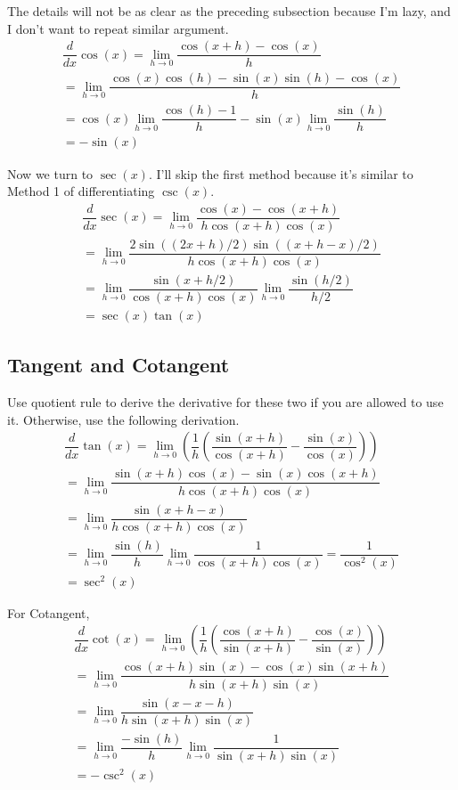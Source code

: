 \documentclass{article}
\theoremstyle{definition}
\theoremstyle{definition}
\theoremstyle{definition}
\theoremstyle{definition}
\theoremstyle{definition}
\theoremstyle{definition}
\theoremstyle{definition}
\theoremstyle{definition}
\theoremstyle{definition}
\begin{document}
The details will not be as clear as the preceding subsection because I'm lazy, and I don't want to repeat similar argument.
\begin{align*}
    \dfrac{d}{dx}\cos(x)=\lim_{h\to0}\dfrac{\cos(x+h)-\cos(x)}{h}\\
    =\lim_{h\to0}\dfrac{\cos(x)\cos(h)-\sin(x)\sin(h)-\cos(x)}{h}\\
    =\cos(x)\lim_{h\to0}\dfrac{\cos(h)-1}{h}-\sin(x)\lim_{h\to0}\dfrac{\sin(h)}{h}\\
    =-\sin(x)
\end{align*}

Now we turn to $\sec(x)$. I'll skip the first method because it's similar to Method 1 of differentiating $\csc(x)$.
\begin{align*}
    \dfrac{d}{dx}\sec(x)=\lim_{h\to0}\dfrac{\cos(x)-\cos(x+h)}{h\cos(x+h)\cos(x)}\\
    =\lim_{h\to0}\dfrac{2\sin((2x+h)/2)\sin((x+h-x)/2)}{h\cos(x+h)\cos(x)}\\
    =\lim_{h\to0}\dfrac{\sin(x+h/2)}{\cos(x+h)\cos(x)}\lim_{h\to0}\dfrac{\sin(h/2)}{h/2}\\
    =\sec(x)\tan(x)
\end{align*}

\subsection{Tangent and Cotangent}
Use quotient rule to derive the derivative for these two if you are allowed to use it. Otherwise, use the following derivation.
\begin{align*}
    \dfrac{d}{dx}\tan(x)=\lim_{h\to0}\left(\dfrac{1}{h}\left(\dfrac{\sin(x+h)}{\cos(x+h)}-\dfrac{\sin(x)}{\cos(x)}\right)\right)\\
    =\lim_{h\to0}\dfrac{\sin(x+h)\cos(x)-\sin(x)\cos(x+h)}{h\cos(x+h)\cos(x)}\\
    =\lim_{h\to0}\dfrac{\sin(x+h-x)}{h\cos(x+h)\cos(x)}\\
    =\lim_{h\to0}\dfrac{\sin(h)}{h}\lim_{h\to0}\dfrac{1}{\cos(x+h)\cos(x)}
    =\dfrac{1}{\cos^2(x)}\\
    =\sec^2(x)
\end{align*}

For Cotangent,
\begin{align*}
    \dfrac{d}{dx}\cot(x)=\lim_{h\to0}\left(\dfrac{1}{h}\left(\dfrac{\cos(x+h)}{\sin(x+h)}-\dfrac{\cos(x)}{\sin(x)}\right)\right)\\
    =\lim_{h\to0}\dfrac{\cos(x+h)\sin(x)-\cos(x)\sin(x+h)}{h\sin(x+h)\sin(x)}\\
    =\lim_{h\to0}\dfrac{\sin(x-x-h)}{h\sin(x+h)\sin(x)}\\
    =\lim_{h\to0}\dfrac{-\sin(h)}{h}\lim_{h\to0}\dfrac{1}{\sin(x+h)\sin(x)}\\
    =-\csc^2(x)
\end{align*}
\end{document}
